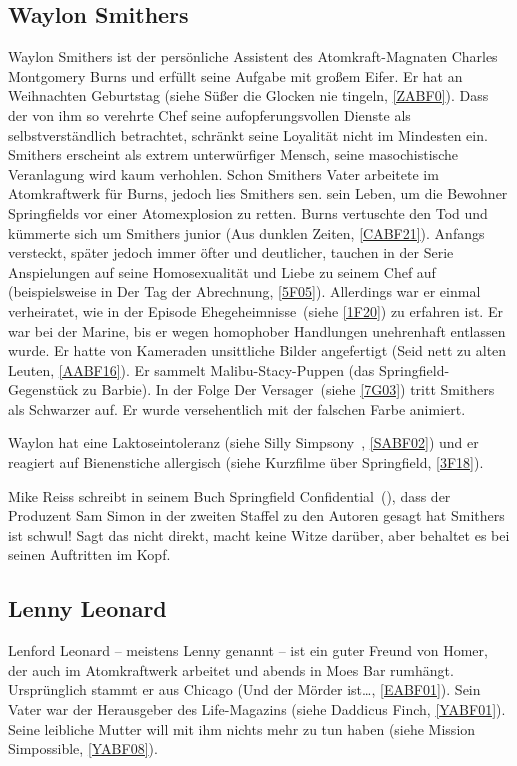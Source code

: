 \subsection{Waylon Smithers}\label{WaylonSmithers}
Waylon Smithers ist der persönliche Assistent des Atomkraft-Magnaten Charles Montgomery Burns und erfüllt seine Aufgabe mit großem Eifer. Er hat an Weihnachten Geburtstag (siehe \glqq Süßer die Glocken nie tingeln\grqq, \ref{ZABF0}). Dass der von ihm so verehrte Chef seine aufopferungsvollen Dienste als selbstverständlich betrachtet, schränkt seine Loyalität nicht im Mindesten ein. Smithers erscheint als extrem unterwürfiger Mensch, seine masochistische Veranlagung wird kaum verhohlen. Schon Smithers Vater arbeitete im Atomkraftwerk für Burns, jedoch lies Smithers sen. sein Leben, um die Bewohner Springfields vor einer Atomexplosion zu retten. Burns vertuschte den Tod und kümmerte sich um Smithers junior (\glqq Aus dunklen Zeiten\grqq , \ref{CABF21}). Anfangs versteckt, später jedoch immer öfter und deutlicher, tauchen in der Serie Anspielungen auf seine Homosexualität und Liebe zu seinem Chef auf (beispielsweise in \glqq Der Tag der Abrechnung\grqq , \ref{5F05}). Allerdings war er einmal verheiratet, wie in der Episode \glqq Ehegeheimnisse\grqq\ (siehe \ref{1F20}) zu erfahren ist. Er war bei der Marine, bis er wegen homophober Handlungen unehrenhaft entlassen wurde. Er hatte von Kameraden unsittliche Bilder angefertigt (\glqq Seid nett zu alten Leuten\grqq , \ref{AABF16}). Er sammelt Malibu-Stacy-Puppen (das Springfield-Gegenstück zu Barbie). In der Folge \glqq Der Versager\grqq\ (siehe \ref{7G03}) tritt Smithers als Schwarzer auf. Er wurde versehentlich mit der falschen Farbe animiert.

Waylon hat eine Laktoseintoleranz (siehe \glqq Silly Simpsony\grqq\ , \ref{SABF02}) und er reagiert auf Bienenstiche allergisch (siehe  Kurzfilme über Springfield\grqq , \ref{3F18}).

Mike Reiss schreibt in seinem Buch \glqq Springfield Confidential\grqq\ (\cite{Reiss19}), dass der Produzent Sam Simon in der zweiten Staffel zu den Autoren gesagt hat \glqq Smithers ist schwul! Sagt das nicht direkt, macht keine Witze darüber, aber behaltet es bei seinen Auftritten im Kopf\grqq.


\subsection{Lenny Leonard}\label{LennyLeonard}
Lenford Leonard -- meistens Lenny genannt -- ist ein guter Freund von Homer, der auch im Atomkraftwerk arbeitet und abends in Moes Bar rumhängt. Ursprünglich stammt er aus Chicago (\glqq Und der Mörder ist\dots\grqq , \ref{EABF01}). Sein Vater war der Herausgeber des Life-Magazins (siehe \glqq Daddicus Finch\grqq, \ref{YABF01}). Seine leibliche Mutter will mit ihm nichts mehr zu tun haben (siehe \glqq Mission Simpossible\grqq, \ref{YABF08}).

